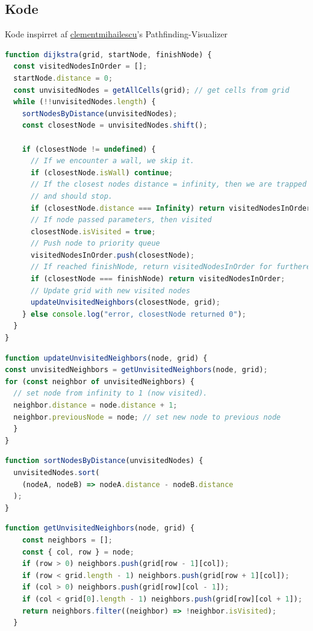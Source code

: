 \documentclass[12pt]{article}
\begin{document}
\subsection{Kode}
Kode inspirret af \href{https://github.com/clementmihailescu/Pathfinding-Visualizer-Tutorial}{clementmihailescu}'s Pathfinding-Visualizer
\begin{lstlisting}[language=JavaScript, caption=Kode for Dijkstra's Algoritme, label={lst:Dijkstra}]
function dijkstra(grid, startNode, finishNode) {
  const visitedNodesInOrder = [];
  startNode.distance = 0;
  const unvisitedNodes = getAllCells(grid); // get cells from grid
  while (!!unvisitedNodes.length) {
    sortNodesByDistance(unvisitedNodes);
    const closestNode = unvisitedNodes.shift();

    if (closestNode != undefined) {
      // If we encounter a wall, we skip it.
      if (closestNode.isWall) continue;
      // If the closest nodes distance = infinity, then we are trapped 
      // and should stop.
      if (closestNode.distance === Infinity) return visitedNodesInOrder;
      // If node passed parameters, then visited
      closestNode.isVisited = true; 
      // Push node to priority queue
      visitedNodesInOrder.push(closestNode);
      // If reached finishNode, return visitedNodesInOrder for furthere use.
      if (closestNode === finishNode) return visitedNodesInOrder;
      // Update grid with new visited nodes
      updateUnvisitedNeighbors(closestNode, grid); 
    } else console.log("error, closestNode returned 0");
  }
}
\end{lstlisting}
\begin{lstlisting}[language=JavaScript, caption=Kode for opdatering af unvisitedNodes]
function updateUnvisitedNeighbors(node, grid) {
const unvisitedNeighbors = getUnvisitedNeighbors(node, grid);
for (const neighbor of unvisitedNeighbors) {
  // set node from infinity to 1 (now visited).
  neighbor.distance = node.distance + 1;
  neighbor.previousNode = node; // set new node to previous node
  }
}
\end{lstlisting}
\begin{lstlisting}[language=JavaScript, caption=Kode for finde tætteste nodes]
  function sortNodesByDistance(unvisitedNodes) {
  unvisitedNodes.sort(
    (nodeA, nodeB) => nodeA.distance - nodeB.distance
  );
}
\end{lstlisting}
\begin{lstlisting}[language=JavaScript, caption=Kode for at søge nye nodes]
  function getUnvisitedNeighbors(node, grid) {
    const neighbors = [];
    const { col, row } = node;
    if (row > 0) neighbors.push(grid[row - 1][col]);
    if (row < grid.length - 1) neighbors.push(grid[row + 1][col]);
    if (col > 0) neighbors.push(grid[row][col - 1]);
    if (col < grid[0].length - 1) neighbors.push(grid[row][col + 1]);
    return neighbors.filter((neighbor) => !neighbor.isVisited);
  }
  
\end{lstlisting}
\end{document}
